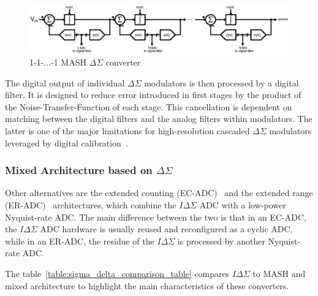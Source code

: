 \begin{figure}[htp]
    \centering
    \includegraphics[width=\textwidth]{Chapter2/Figs/Vector/sigma-delta-mash.ps}
    \caption{1-1-...-1 MASH $\Delta\Sigma$ converter}
    \label{fig:multi-bit}
\end{figure}

The digital output of individual \(\Delta\Sigma \) modulators is then processed by a digital filter. It is designed to reduce error introduced in first stages by the product of the Noise-Transfer-Function of each stage. This cancellation is dependent on matching between the digital filters and the analog filters within modulators. The latter is one of the major limitations for high-resolution cascaded \(\Delta\Sigma \) modulators leveraged by digital calibration~\cite{Cauwenberghs2000}.

\subsubsection{Mixed Architecture based on $\Delta\Sigma$}
Other alternatives are the extended counting (EC-ADC)~\cite{Jeon2017,Baird1995,Chen2016} and the extended range (ER-ADC)~\cite{Agah2010,Rossi2009} architectures, which combine the \(I\Delta\Sigma \) ADC with a low-power Nyquist-rate ADC\@. The main difference between the two is that in an EC-ADC, the \(I\Delta\Sigma \) ADC hardware is usually reused and reconfigured as a cyclic ADC, while in an ER-ADC, the residue  of the \(I\Delta\Sigma \) is processed by another Nyquist-rate ADC\@.

The table~\ref{table:sigma_delta_comparison_table} compares \(I\Delta\Sigma \) to MASH and mixed architecture to highlight the main characteristics of these converters.

